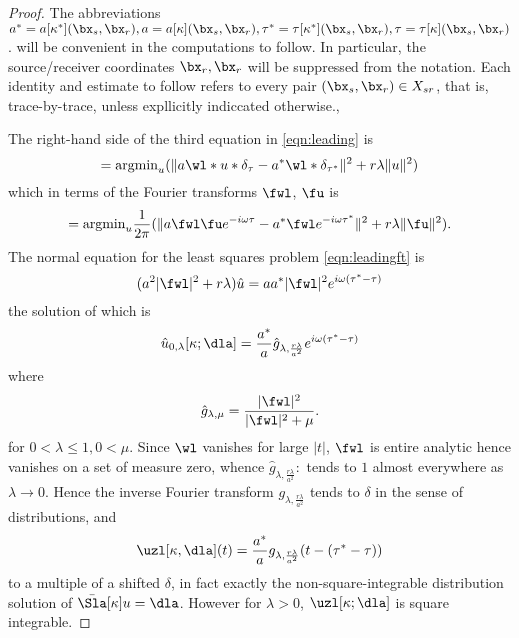\begin{proof}
  The abbreviations
  $a^*=a[\kappa^*](\bx_s,\bx_r), a=a[\kappa](\bx_s,\bx_r),
  \tau^*=\tau[\kappa^*](\bx_s,\bx_r), \tau=\tau[\kappa](\bx_s,\bx_r)$.
  will be convenient in the computations to follow. In particular, the
  source/receiver coordinates $\bx_r,\bx_r$ will be suppressed from
  the notation. Each identity and estimate to follow refers to every
  pair $(\bx_s,\bx_r) \in X_{sr}$, that is, trace-by-trace, unless
  expllicitly indiccated otherwise.,

The right-hand side of the third equation in \ref{eqn:leading} is 
\[
= \mbox{argmin}_u (\|a \wl*u*\delta_{\tau}-a^*\wl*\delta_{\tau^*}\|^2 + r\lambda\|u\|^2)
\]
which in terms of the Fourier transforms $\fwl$, $\fu$ is
\begin{equation}
  \label{eqn:leadingft}
= \mbox{argmin}_u \frac{1}{2\pi}(\|a \fwl \fu e^{-i\omega \tau}-a^*\fwl e^{-i\omega \tau^*}\|^2 + r\lambda\|\fu\|^2).
\end{equation}
The normal equation for the least squares problem \ref{eqn:leadingft} is
\[
(a^2 |\fwl|^2 +r\lambda)\hat{u} = a a^*|\fwl|^2e^{i\omega(\tau^*-\tau)}
\]
the solution of which is
\begin{equation}
  \label{eqn:hatuf}
\hat{u}_{0,\lambda}[\kappa;\dla] = \frac{a^*}{a}\hat{g}_{\lambda,\frac{r\lambda}{a^2}} e^{i\omega(\tau^*-\tau)}
\end{equation}
where
\begin{equation}
  \label{eqn:hatgf}
\hat{g}_{\lambda,\mu} = \frac{|\fwl|^2}{|\fwl|^2 + \mu}.
\end{equation}
for $0 < \lambda \le 1, 0 < \mu$. Since $\wl$ vanishes for large $|t|$, $\fwl$ is entire analytic hence
vanishes on a set of measure zero, whence $\hat{g}_{\lambda,\frac{r\lambda}{a^2}}:$
tends to $1$ almost everywhere as $\lambda \rightarrow 0$. Hence the
inverse Fourier transform $g_{\lambda,\frac{r\lambda}{a^2}}$ tends to $\delta$ in
the sense of distributions, and
\begin{equation}
  \label{eqn:u0s}
\uzl[\kappa,\dla](t) = \frac{a^*}{a}g_{\lambda,\frac{r\lambda}{a^2}}(t-(\tau^*-\tau))
\end{equation}
to a multiple of a shifted $\delta$, in fact exactly the
non-square-integrable distribution
solution of $\bar{\Sla}[\kappa]u=\dla$. However for $\lambda>0$, $\uzl[\kappa;\dla]$ is square integrable.


\end{proof}
